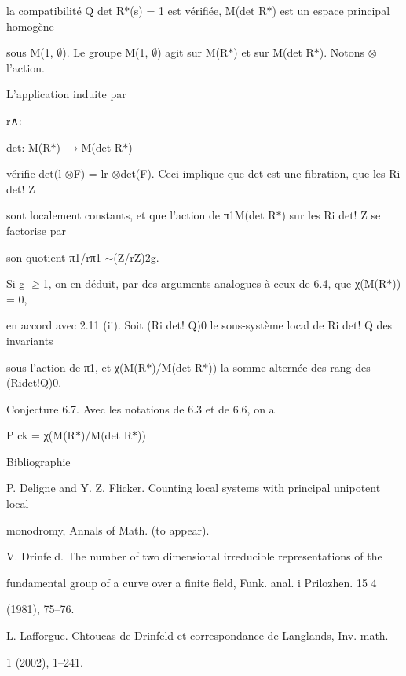 \documentclass[11pt]{article}
\begin{document}
\noindent la compatibilité Q det R\(*\)(s) = 1 est vérifiée, M(det R\(*\)) est un espace principal homogène\par
\noindent sous M(1, \(\emptyset\)). Le groupe M(1, \(\emptyset\)) agit sur M(R\(*\)) et sur M(det R\(*\)). Notons \(\otimes\)l’action.\par
\noindent L’application induite par\par
\noindent r∧:\par
\noindent det: M(R\(*\)) \(\to\)M(det R\(*\))\par
\noindent vérifie det(l \(\otimes\)F) = lr \(\otimes\)det(F). Ceci implique que det est une fibration, que les Ri det! Z\par
\noindent sont localement constants, et que l’action de π1M(det R\(*\)) sur les Ri det! Z se factorise par\par
\noindent son quotient π1/rπ1 \(\sim\)(Z/rZ)2g.\par
\noindent Si g \(\geq\)1, on en déduit, par des arguments analogues à ceux de 6.4, que χ(M(R\(*\))) = 0,\par
\noindent en accord avec 2.11 (ii). Soit (Ri det! Q)0 le sous-système local de Ri det! Q des invariants\par
\noindent sous l’action de π1, et χ(M(R\(*\))/M(det R\(*\))) la somme alternée des rang des (Ridet!Q)0.\par
\noindent Conjecture 6.7. Avec les notations de 6.3 et de 6.6, on a\par
\noindent P ck = χ(M(R\(*\))/M(det R\(*\)))\par
\noindent Bibliographie\par
\noindent [DF]\par
\noindent P. Deligne and Y. Z. Flicker. Counting local systems with principal unipotent local\par
\noindent monodromy, Annals of Math. (to appear).\par
\noindent [Dr]\par
\noindent V. Drinfeld. The number of two dimensional irreducible representations of the\par
\noindent fundamental group of a curve over a finite field, Funk. anal. i Prilozhen. 15 4\par
\noindent (1981), 75–76.\par
\noindent [L]\par
\noindent L. Lafforgue. Chtoucas de Drinfeld et correspondance de Langlands, Inv. math.\par
{} 1 (2002), 1–241.\par
\end{document}
